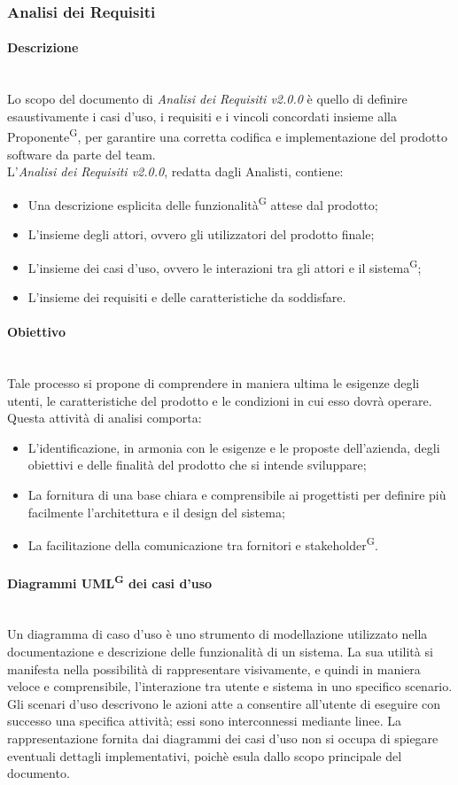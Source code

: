 \documentclass[8pt]{article}
\newcommand{\glossterm}[1]{#1\textsuperscript{G}} %
\newcommand{\subsubsubsection}[1]{\paragraph{#1}\mbox{}\\}
\begin{document}
\subsubsection{Analisi dei Requisiti} \label{sec:analisi-rischi}

\subsubsubsection{Descrizione}
Lo scopo del documento di \textit{Analisi dei Requisiti v2.0.0} è quello di definire esaustivamente i casi d'uso, i requisiti e i vincoli concordati insieme alla \glossterm{Proponente}, per garantire una corretta codifica e implementazione del prodotto software da parte del team.\\
L'\textit{Analisi dei Requisiti v2.0.0}, redatta dagli Analisti, contiene:
\begin{itemize}
    \item Una descrizione esplicita delle \glossterm{funzionalità} attese dal prodotto;
    \item L'insieme degli attori, ovvero gli utilizzatori del prodotto finale;
    \item L'insieme dei casi d'uso, ovvero le interazioni tra gli attori e il \glossterm{sistema};
    \item L'insieme dei requisiti e delle caratteristiche da soddisfare.
\end{itemize}
\subsubsubsection{Obiettivo}
Tale processo si propone di comprendere in maniera ultima le esigenze degli utenti, le caratteristiche del prodotto e le condizioni in cui esso dovrà operare.\\
Questa attività di analisi comporta:
\begin{itemize}
    \item L'identificazione, in armonia con le esigenze e le proposte dell'azienda, degli obiettivi e delle finalità del prodotto che si intende sviluppare;
    \item La fornitura di una base chiara e comprensibile ai progettisti per definire più facilmente l'architettura e il design del sistema;
    \item La facilitazione della comunicazione tra fornitori e \glossterm{stakeholder}.
\end{itemize}
\subsubsubsection{Diagrammi \glossterm{UML} dei casi d'uso}
Un diagramma di caso d'uso è uno strumento di modellazione utilizzato nella documentazione e descrizione delle funzionalità di un sistema. La sua utilità si manifesta nella possibilità di rappresentare visivamente, e quindi in maniera veloce e comprensibile, l'interazione tra utente e sistema in uno specifico scenario. Gli scenari d'uso descrivono le azioni atte a consentire all'utente di eseguire con successo una specifica attività; essi sono interconnessi mediante linee. La rappresentazione fornita dai diagrammi dei casi d'uso non si occupa di spiegare eventuali dettagli implementativi, poichè esula dallo scopo principale del documento.\\
\end{document}
